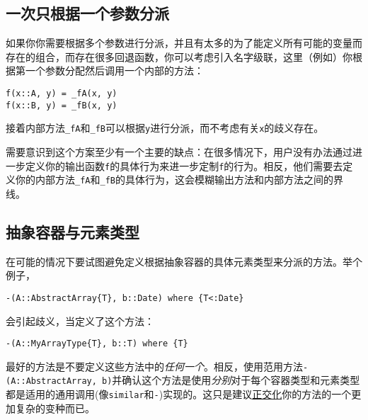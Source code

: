 \hypertarget{2211158616759162982}{}


\subsection{一次只根据一个参数分派}



如果你你需要根据多个参数进行分派，并且有太多的为了能定义所有可能的变量而存在的组合，而存在很多回退函数，你可以考虑引入{\textquotedbl}名字级联{\textquotedbl}，这里（例如）你根据第一个参数分配然后调用一个内部的方法：




\begin{verbatim}
f(x::A, y) = _fA(x, y)
f(x::B, y) = _fB(x, y)
\end{verbatim}



接着内部方法\texttt{\_fA}和\texttt{\_fB}可以根据\texttt{y}进行分派，而不考虑有关\texttt{x}的歧义存在。



需要意识到这个方案至少有一个主要的缺点：在很多情况下，用户没有办法通过进一步定义你的输出函数\texttt{f}的具体行为来进一步定制\texttt{f}的行为。相反，他们需要去定义你的内部方法\texttt{\_fA}和\texttt{\_fB}的具体行为，这会模糊输出方法和内部方法之间的界线。



\hypertarget{7624993517486343641}{}


\subsection{抽象容器与元素类型}



在可能的情况下要试图避免定义根据抽象容器的具体元素类型来分派的方法。举个例子，




\begin{verbatim}
-(A::AbstractArray{T}, b::Date) where {T<:Date}
\end{verbatim}



会引起歧义，当定义了这个方法：




\begin{verbatim}
-(A::MyArrayType{T}, b::T) where {T}
\end{verbatim}



最好的方法是不要定义这些方法中的\emph{任何一个}。相反，使用范用方法\texttt{-(A::AbstractArray, b)}并确认这个方法是使用\emph{分别}对于每个容器类型和元素类型都是适用的通用调用(像\texttt{similar}和\texttt{-})实现的。这只是建议\hyperlink{1356336112225694303}{正交化}你的方法的一个更加复杂的变种而已。



